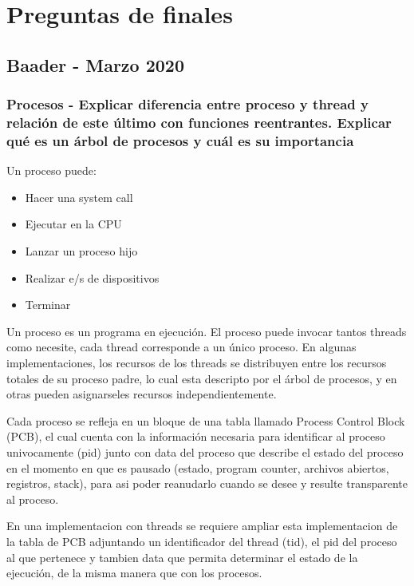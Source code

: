\section{Preguntas de finales}

\subsection{Baader - Marzo 2020}
\subsubsection{Procesos - Explicar diferencia entre proceso y thread y relación de este último con funciones reentrantes. Explicar qué es un árbol de procesos y cuál es su importancia}

Un proceso puede:
\begin{itemize}
\item Hacer una system call \\
\item Ejecutar en la CPU \\
\item Lanzar un proceso hijo \\
\item Realizar e/s de dispositivos \\
\item Terminar \\
\end{itemize}


Un proceso es un programa en ejecución. El proceso puede invocar tantos threads como necesite, cada thread corresponde a un único proceso. En algunas implementaciones, los recursos de los threads se distribuyen entre los recursos totales de su proceso padre, lo cual esta descripto por el árbol de procesos, y en otras pueden asignarseles recursos independientemente.

Cada proceso se refleja en un bloque de una tabla llamado Process Control Block (PCB), el cual cuenta con la información necesaria para identificar al proceso univocamente (pid) junto con data del proceso que describe el estado del proceso en el momento en que es pausado (estado, program counter, archivos abiertos, registros, stack), para asi poder reanudarlo cuando se desee y resulte transparente al proceso.

En una implementacion con threads se requiere ampliar esta implementacion de la tabla de PCB adjuntando un identificador del thread (tid), el pid del proceso al que pertenece y tambien data que permita determinar el estado de la ejecución, de la misma manera que con los procesos.

